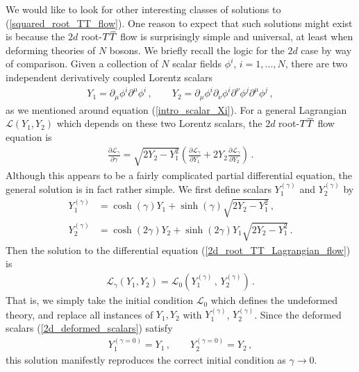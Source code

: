\documentclass[12pt]{article}
\numberwithin{equation}{section}
\newcommand{\overbar}[1]{\mkern 1.5mu\overline{\mkern-1.5mu#1\mkern-1.5mu}\mkern 1.5mu}
\def\TT{{T\overbar{T}}}
\begin{document}
We would like to look for other interesting classes of solutions to (\ref{squared_root_TT_flow}). One reason to expect that such solutions might exist is because the $2d$ root-$\TT$ flow is surprisingly simple and universal, at least when deforming theories of $N$ bosons. We briefly recall the logic for the $2d$ case by way of comparison. Given a collection of $N$ scalar fields $\phi^i$, $i = 1 , \ldots , N$, there are two independent derivatively coupled Lorentz scalars
%
\begin{align}
    Y_1 = \partial_\mu \phi^i \partial^\mu \phi^i \, , \qquad Y_2 = \partial_\mu \phi^i \partial_\nu \phi^i \partial^\nu \phi^j \partial^\mu \phi^j \, ,
\end{align}
%
as we mentioned around equation (\ref{intro_scalar_Xi}). For a general Lagrangian $\mathcal{L} ( Y_1, Y_2 )$ which depends on these two Lorentz scalars, the $2d$ root-$\TT$ flow equation is
%
\begin{align}\label{2d_root_TT_Lagrangian_flow}
    \frac{\partial \mathcal{L}_\gamma}{\partial \gamma} = \sqrt{ 2 Y_2 - Y_1^2 } \left( \frac{\partial \mathcal{L}_\gamma}{\partial Y_1} + 2 Y_2 \frac{\partial \mathcal{L}_\gamma}{\partial Y_2} \right) \, .
\end{align}
%
Although this appears to be a fairly complicated partial differential equation, the general solution is in fact rather simple. We first define scalars $Y_1^{(\gamma)}$ and $Y_2^{(\gamma)}$ by
%
\begin{align}\label{2d_deformed_scalars}
    Y_1^{(\gamma)} &= \cosh ( \gamma ) Y_1 + \sinh ( \gamma ) \sqrt{ 2 Y_2 - Y_1^2 } \, , \nonumber \\
    Y_2^{(\gamma)} &= \cosh ( 2 \gamma ) Y_2 + \sinh ( 2 \gamma ) Y_1 \sqrt{ 2 Y_2 - Y_1^2 } \, .
\end{align}
%
Then the solution to the differential equation (\ref{2d_root_TT_Lagrangian_flow}) is
%
\begin{align}\label{general_2d_solution}
    \mathcal{L}_\gamma ( Y_1, Y_2 ) = \mathcal{L}_0 \left( Y_1^{(\gamma)} \, , \, Y_2^{(\gamma)} \right) \, .
\end{align}
%
That is, we simply take the initial condition $\mathcal{L}_0$ which defines the undeformed theory, and replace all instances of $Y_1, Y_2$ with $Y_1^{(\gamma)}$, $Y_2^{(\gamma)}$. Since the deformed scalars (\ref{2d_deformed_scalars}) satisfy 
%
\begin{align}
    Y_1^{(\gamma = 0)} = Y_1 \, , \qquad Y_2^{(\gamma = 0)} = Y_2 \, , 
\end{align}
%
this solution manifestly reproduces the correct initial condition as $\gamma \to 0$.
\end{document}
